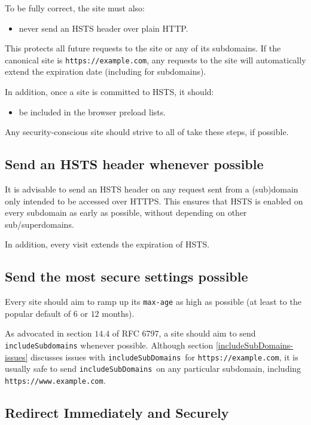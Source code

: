 \documentclass[conference]{./IEEEtran}
\newcommand{\site}[1]{\texttt{#1}}
\newcommand{\code}[1]{\texttt{#1}}
\newcommand{\iSD}{{\code{includeSubDomains}}}
\newcommand{\genericsite}{example.com}
\newcommand{\s}{{\site{https://\genericsite}}}
\newcommand{\sw}{{\site{https://www.\genericsite}}}
\theoremstyle{plain}
\begin{document}
To be fully correct, the site must also:

\begin{itemize}
\item never send an HSTS header over plain HTTP.
\end{itemize}

This protects all future requests to the site or any of its subdomains. If the canonical site is \s, any requests to the site will automatically extend the expiration date (including for subdomains).

In addition, once a site is committed to HSTS, it should:
\begin{itemize}
\item be included in the browser preload lists.
\end{itemize}

Any security-conscious site should strive to all of take these steps, if possible.

\subsection{Send an HSTS header whenever possible}

It is advisable to send an HSTS header on any request sent from a (sub)domain only intended to be accessed over HTTPS. This ensures that HSTS is enabled on every subdomain as early as possible, without depending on other sub/superdomains.

In addition, every visit extends the expiration of HSTS.

\subsection{Send the most secure settings possible}

Every site should aim to ramp up its \code{max-age} as high as possible (at least to the popular default of $6$ or $12$ months).

As advocated in section $14.4$ of RFC 6797\cite{rfc}, a site should aim to send \code{includeSubdomains} whenever possible. Although section \ref{includeSubDomains-issues} discusses issues with \iSD~for \s, it is usually safe to send \iSD~on any particular subdomain, including \sw.

\subsection{Redirect Immediately and Securely}
\end{document}
